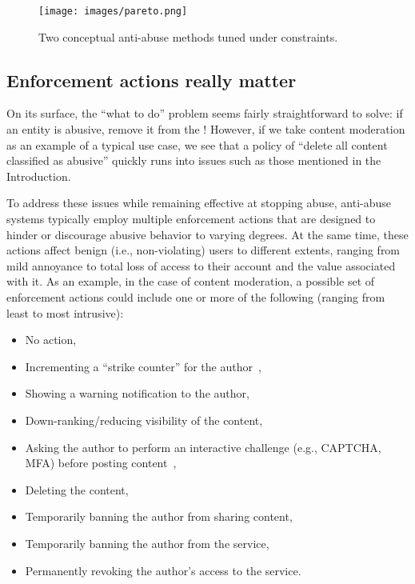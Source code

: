 \begin{figure}[htbp]
\centering
\captionsetup{justification=centering,margin=1cm}
\texttt{[image: images/pareto.png]}
\caption{Two conceptual anti-abuse methods tuned under constraints.}\label{fig:pareto}
\end{figure}

\subsection{Enforcement actions really matter}\label{sec:enforcement_actions}

On its surface, the ``what to do'' problem seems fairly straightforward to solve: if an entity is abusive, remove it from the \osn! However, if we take content moderation as an example of a typical use case, we see that a policy of ``delete all content classified as abusive'' quickly runs into issues such as those mentioned in the Introduction.

To address these issues while remaining effective at stopping abuse, anti-abuse systems typically employ multiple enforcement actions that are designed to hinder or discourage abusive behavior to varying degrees. At the same time, these actions affect benign (i.e., non-violating) users to different extents, ranging from mild annoyance to total loss of access to their account and the value associated with it.
As an example, in the case of content moderation, a possible set of enforcement actions could include one or more of the following (ranging from least to most intrusive):
\begin{itemize}
\vspace{-2pt}
\squeezelist
    \item No action,
    \item Incrementing a ``strike counter'' for the author~\cite{youtube},
    \item Showing a warning notification to the author,
    \item Down-ranking/reducing visibility of the content,
    \item Asking the author to perform an interactive challenge (e.g., CAPTCHA, MFA) before posting content~\cite{von2003captcha,searles2023empirical},
    \item Deleting the content,
    \item Temporarily banning the author from sharing content,
    \item Temporarily banning the author from the service,
    \item Permanently revoking the author’s access to the service.
\end{itemize}

